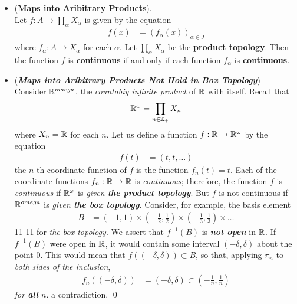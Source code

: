 \documentclass[11pt]{article}
\begin{document}
\begin{itemize}
\item \begin{proposition} (\textbf{Maps into Aribitrary Products}). \citep{munkres2000topology}\\
Let $f : A \rightarrow \prod_{\alpha}X_{\alpha}$ is given by the equation
\begin{align*}
f(x) &= (f_{\alpha}(x))_{\alpha \in J}
\end{align*}
where $f_{\alpha} : A \rightarrow X_\alpha$ for each $\alpha$. Let  $\prod_{\alpha}X_{\alpha}$ be the \textbf{product topology}. Then the
function $f$ is \textbf{continuous} if and only if each function $f_{\alpha}$  is \textbf{continuous}.
\end{proposition}

\item \begin{example} (\textbf{\emph{Maps into Aribitrary Products Not Hold in Box Topology}})\\
Consider ${\mathbb R}^{omega}$, the \emph{countabiy infinite product} of ${\mathbb R}$ with itself. Recall that 
\begin{align*}
{\mathbb R}^{\omega} = \prod_{n \in {\mathbb Z}_{+}}X_{n}
\end{align*}
where $X_{n} = {\mathbb R}$ for each $n$. Let us define a function $f: {\mathbb R} \rightarrow {\mathbb R}^{\omega}$ by the equation
\begin{align*}
f(t) &= (t, t, \ldots)
\end{align*}
the $n$-th coordinate function of $f$ is the function $f_n(t) = t$. Each of the coordinate functions $f_n : {\mathbb R} \rightarrow {\mathbb R}$ is \emph{continuous}; therefore, the function $f$ is \emph{continuous} if ${\mathbb R}^{\omega}$ is \emph{given \textbf{the product topology}}. But $f$ is not continuous if ${\mathbb R}^{omega}$ is \emph{given \textbf{the box topology}}. Consider, for example, the basis element
\begin{align*}
B &= (-1, 1) \times (-\frac{1}{2}, \frac{1}{2}) \times (-\frac{1}{3}, \frac{1}{3}) \times \ldots
\end{align*}
11 11
for \emph{the box topology}. We assert that $f^{-1}(B)$ is \emph{\textbf{not open}} in ${\mathbb R}$. If $f^{-1}(B)$ were open in ${\mathbb R}$, it would contain some interval $(-\delta, \delta)$ about the point $0$. This would mean that $f((-\delta, \delta)) \subset B$, so that, applying $\pi_n$ to \emph{both sides of the inclusion},
\begin{align*}
f_{n}((-\delta, \delta)) &= (-\delta, \delta) \subset (-\frac{1}{n}, \frac{1}{n})
\end{align*}
\emph{for \textbf{all} $n$}. a contradiction. \qed
\end{example}

\end{itemize}
\end{document}
